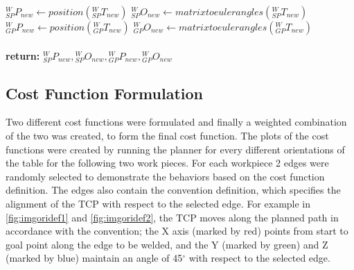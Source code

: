 \begin{algorithm}
\begin{algorithmic}[1]
		\State $\textit{$_{SP}^{W}P_{new}$} \gets position(\textit{$_{SP}^{W}T_{new}$})$
		\State $\textit{$_{SP}^{W}O_{new}$} \gets matrixtoeulerangles(\textit{$_{SP}^{W}T_{new}$})$
		\State $\textit{$_{GP}^{W}P_{new}$} \gets position(\textit{$_{GP}^{W}T_{new}$})$
		\State $\textit{$_{GP}^{W}O_{new}$} \gets matrixtoeulerangles(\textit{$_{GP}^{W}T_{new}$})$\\
		
		\EndFor \\
		\textbf{return:} $\textit{$_{SP}^{W}P_{new}$},\textit{$_{SP}^{W}O_{new}$},\textit{$_{GP}^{W}P_{new}$},\textit{$_{GP}^{W}O_{new}$}$
	\end{algorithmic}
\end{algorithm}
\newpage
\subsection{Cost Function Formulation}
Two different cost functions were formulated and finally a weighted combination of the two was created, to form the final cost function. The plots of the cost functions were created by running the planner for every different orientations of the table for the following two work pieces. For each workpiece 2 edges were randomly selected to demonstrate the behaviors based on the cost function definition. The edges also contain the convention definition, which specifies the alignment of the TCP with respect to the selected edge. For example in \ref{fig:imgoridef1} and \ref{fig:imgoridef2}, the TCP moves along the planned path in accordance with the convention; the X axis (marked by red) points from start to goal point along the edge to be welded, and the Y (marked by green) and Z (marked by blue) maintain an angle of 45$^{\circ}$ with respect to the selected edge. \\
